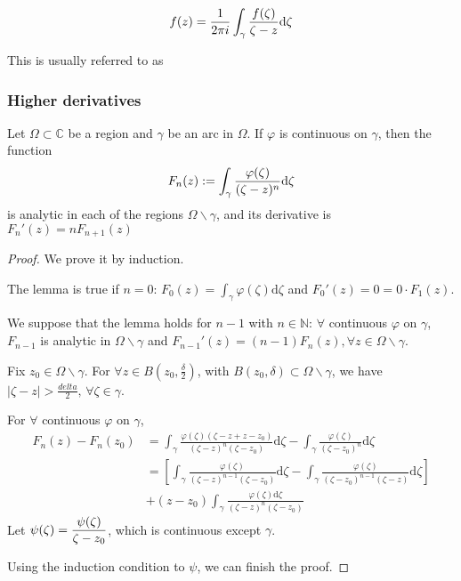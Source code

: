 \[\displaystyle f(z)=\frac{1}{2\pi i}\int_\gamma\frac{f(\zeta)}{\zeta-z}\mathrm{d}\zeta\]

This is usually referred to as 

\subsubsection{Higher derivatives}
\begin{lemma}\label{Lemma of Analytic Properties of integral function}\label{lemma in section 2.3}
    Let  $ \Omega\subset\mathbb{C}$ be a region and  $ \gamma $ be an arc in  $ \Omega $. If  $ \varphi $ is continuous on  $ \gamma $, then the function 
    \[F_n(z):=\displaystyle\int_\gamma\frac{\varphi(\zeta)}{(\zeta-z)^n}\mathrm{d}\zeta\]
    is analytic in each of the regions  $ \Omega\backslash \gamma $, and its derivative is  $ F_n'(z)=nF_{n+1}(z) $
\end{lemma}
\begin{proof}
    We prove it by induction. 
    
    The lemma is true if  $ n=0 $:  $ F_0(z)=\int_\gamma\varphi(\zeta)\mathrm{d}\zeta $ and  $ F_0'(z)=0=0\cdot F_1(z) $.
    
    We suppose that the lemma holds for  $ n-1 $ with  $ n\in \mathbb{N} $:  $ \forall  $ continuous $ \varphi $ on  $ \gamma $,  $ F_{n-1} $ is analytic in  $ \Omega\backslash \gamma $ and  $ F_{n-1}'
    (z)=(n-1)F_n(z),\forall z\in \Omega\backslash \gamma $.
    
    Fix  $ z_0\in \Omega\backslash \gamma $. For  $ \forall z\in B(z_0,\frac{\delta}{2}) $, with  $ B(z_0,\delta)\subset \Omega\backslash \gamma $, we have  $ |\zeta-z|>\frac{delta}{2},\,\forall \zeta\in \gamma $.
    
    For  $ \forall  $ continuous  $ \varphi $ on  $ \gamma $,  
    \begin{align*}
        F_n(z)-F_n(z_0)&=\int_\gamma \frac{\varphi(\zeta)(\zeta-z+z-z_0)}{(\zeta-z)^n(\zeta-z_0)} \mathrm{d}\zeta-\int_\gamma\frac{\varphi(\zeta)}{(\zeta-z_0)^n}\mathrm{d}\zeta\\
        &=\left[
        \int_\gamma\frac{\varphi(\zeta)}{(\zeta-z)^{n-1}(\zeta-z_0)}\mathrm{d}\zeta-\int_\gamma\frac{\varphi(\zeta)}{(\zeta-z_0)^{n-1}(\zeta-z)} \mathrm{d}\zeta
    \right]\\
    &+(z-z_0)\int_\gamma\frac{\varphi(\zeta)\mathrm{d}\zeta}{(\zeta-z)^n(\zeta-z_0)}
    \end{align*}   
    Let  $ \psi(\zeta)=\displaystyle\frac{\psi(\zeta)}{\zeta-z_0} $, which is continuous except  $ \gamma $. 
    
    Using the induction condition to  $ \psi $, we can finish the proof. 
\end{proof}